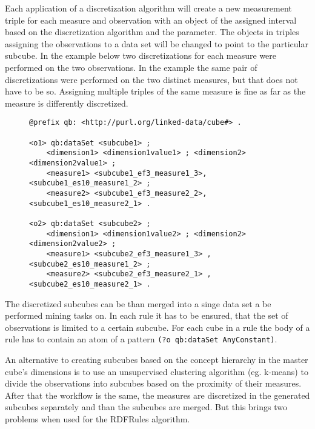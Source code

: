 Each application of a discretization algorithm will create a new measurement triple for each measure and observation with an object of the assigned interval based on the discretization algorithm and the parameter. The objects in triples assigning the observations to a data set will be changed to point to the particular subcube. In the example below two discretizations for each measure were performed on the two observations. In the example the same pair of discretizations were performed on the two distinct measures, but that does not have to be so. Assigning multiple triples of the same measure is fine as far as the measure is differently discretized. 

\begin{figure}[h]
\begin{lstlisting}[language = turtle, caption={Discretization example}, label={discsample},captionpos=b escapeinside={(*@}{@*)}]
@prefix qb: <http://purl.org/linked-data/cube#> .
        
<o1> qb:dataSet <subcube1> ;
    <dimension1> <dimension1value1> ; <dimension2> <dimension2value1> ;
    <measure1> <subcube1_ef3_measure1_3>, <subcube1_es10_measure1_2> ;
    <measure2> <subcube1_ef3_measure2_2>, <subcube1_es10_measure2_1> .

<o2> qb:dataSet <subcube2> ;
    <dimension1> <dimension1value2> ; <dimension2> <dimension2value2> ;
    <measure1> <subcube2_ef3_measure1_3> , <subcube2_es10_measure1_2> ;
    <measure2> <subcube2_ef3_measure2_1> ,<subcube2_es10_measure2_1> .
\end{lstlisting}
\end{figure}

The discretized subcubes can be than merged into a singe data set a be performed mining tasks on. In each rule it has to be ensured, that the set of observations is limited to a certain subcube. For each cube in a rule the body of a rule has to contain an atom of a pattern \verb|(?o qb:dataSet AnyConstant)|. 

An alternative to creating subcubes based on the concept hierarchy in the master cube's dimensions is to use an unsupervised clustering algorithm (eg. k-means) to divide the observations into subcubes based on the proximity of their measures. After that the workflow is the same, the measures are discretized in the generated subcubes separately and than the subcubes are merged. But this brings two problems when used for the RDFRules algorithm.

